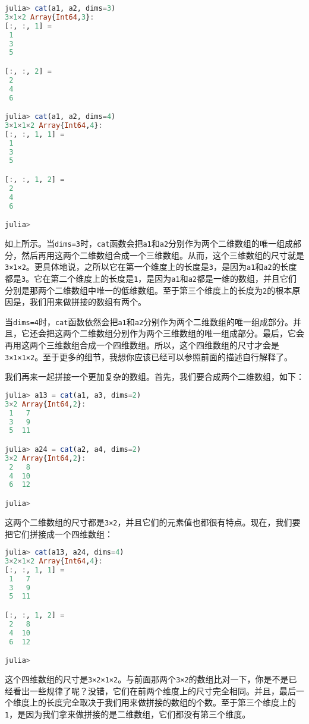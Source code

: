 \begin{lstlisting}[language=julia]
julia> cat(a1, a2, dims=3)
3×1×2 Array{Int64,3}:
[:, :, 1] =
 1
 3
 5

[:, :, 2] =
 2
 4
 6

julia> cat(a1, a2, dims=4)
3×1×1×2 Array{Int64,4}:
[:, :, 1, 1] =
 1
 3
 5

[:, :, 1, 2] =
 2
 4
 6

julia> 
\end{lstlisting}

如上所示。当\verb|dims=3|时，\verb|cat|函数会把\verb|a1|和\verb|a2|分别作为两个二维数组的唯一组成部分，然后再用这两个二维数组合成一个三维数组。从而，这个三维数组的尺寸就是\verb|3×1×2|。更具体地说，之所以它在第一个维度上的长度是\verb|3|，是因为\verb|a1|和\verb|a2|的长度都是\verb|3|。它在第二个维度上的长度是\verb|1|，是因为\verb|a1|和\verb|a2|都是一维的数组，并且它们分别是那两个二维数组中唯一的低维数组。至于第三个维度上的长度为\verb|2|的根本原因是，我们用来做拼接的数组有两个。

当\verb|dims=4|时，\verb|cat|函数依然会把\verb|a1|和\verb|a2|分别作为两个二维数组的唯一组成部分。并且，它还会把这两个二维数组分别作为两个三维数组的唯一组成部分。最后，它会再用这两个三维数组合成一个四维数组。所以，这个四维数组的尺寸才会是\verb|3×1×1×2|。至于更多的细节，我想你应该已经可以参照前面的描述自行解释了。

我们再来一起拼接一个更加复杂的数组。首先，我们要合成两个二维数组，如下：

\begin{lstlisting}[language=julia]
julia> a13 = cat(a1, a3, dims=2)
3×2 Array{Int64,2}:
 1   7
 3   9
 5  11

julia> a24 = cat(a2, a4, dims=2)
3×2 Array{Int64,2}:
 2   8
 4  10
 6  12

julia> 
\end{lstlisting}

这两个二维数组的尺寸都是\verb|3×2|，并且它们的元素值也都很有特点。现在，我们要把它们拼接成一个四维数组：

\begin{lstlisting}[language=julia]
julia> cat(a13, a24, dims=4)
3×2×1×2 Array{Int64,4}:
[:, :, 1, 1] =
 1   7
 3   9
 5  11

[:, :, 1, 2] =
 2   8
 4  10
 6  12

julia> 
\end{lstlisting}

这个四维数组的尺寸是\verb|3×2×1×2|。与前面那两个\verb|3×2|的数组比对一下，你是不是已经看出一些规律了呢？没错，它们在前两个维度上的尺寸完全相同。并且，最后一个维度上的长度完全取决于我们用来做拼接的数组的个数。至于第三个维度上的\verb|1|，是因为我们拿来做拼接的是二维数组，它们都没有第三个维度。

